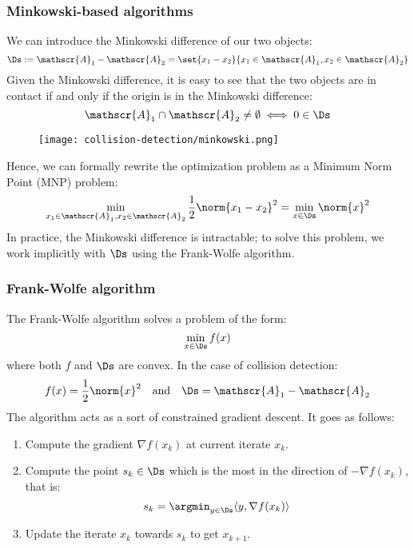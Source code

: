 \subsubsection{Minkowski-based algorithms}
We can introduce the Minkowski difference of our two objects:
\begin{equation*}
    \Ds := \mathscr{A}_1 - \mathscr{A}_2 = \set{x_1-x_2}{x_1\in\mathscr{A}_1, x_2\in\mathscr{A}_2}
\end{equation*}
Given the Minkowski difference, it is easy to see that the two objects are in contact if and only if the origin is in the Minkowski difference:
\begin{equation*}
    \mathscr{A}_1\cap\mathscr{A}_2\neq\emptyset \iff 0\in\Ds
\end{equation*}
\begin{figure}[H]
    \centering
    \texttt{[image: collision-detection/minkowski.png]}
\end{figure}
Hence, we can formally rewrite the optimization problem as a Minimum Norm Point (MNP) problem:
\begin{equation*}
    \min_{x_1\in\mathscr{A}_1, x_2\in\mathscr{A}_2} \frac{1}{2}\norm{x_1-x_2}^2 = \min_{x\in\Ds} \norm{x}^2
\end{equation*}
In practice, the Minkowski difference is intractable; to solve this problem, we work implicitly with $\Ds$ using the Frank-Wolfe algorithm.

\subsubsection{Frank-Wolfe algorithm}
The Frank-Wolfe algorithm solves a problem of the form:
\begin{equation*}
    \min_{x\in\Ds} f(x)
\end{equation*}
where both $f$ and $\Ds$ are convex. In the case of collision detection:
\begin{equation*}
    f(x) = \frac{1}{2}\norm{x}^2 \quad \text{and} \quad \Ds = \mathscr{A}_1 - \mathscr{A}_2
\end{equation*}
The algorithm acts as a sort of constrained gradient descent. It goes as follows:
\begin{enumerate}
    \item Compute the gradient $\nabla f(x_k)$ at current iterate $x_k$.
    \item Compute the point $s_k\in\Ds$ which is the most in the direction of $-\nabla f(x_k)$, that is:
    \begin{equation*}
        s_k = \argmin_{y\in\Ds} \langle y, \nabla f(x_k)\rangle
    \end{equation*}
    \item Update the iterate $x_k$ towards $s_k$ to get $x_{k+1}$.
\end{enumerate}

